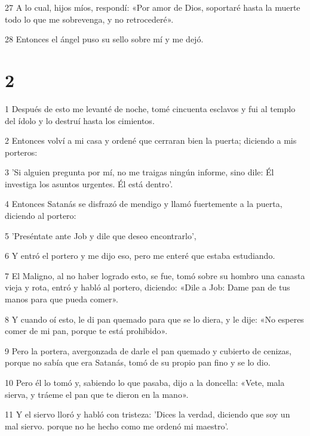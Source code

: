 \par 27 A lo cual, hijos míos, respondí: «Por amor de Dios, soportaré hasta la muerte todo lo que me sobrevenga, y no retrocederé».

\par 28 Entonces el ángel puso su sello sobre mí y me dejó.

\chapter{2}

\par 1 Después de esto me levanté de noche, tomé cincuenta esclavos y fui al templo del ídolo y lo destruí hasta los cimientos.

\par 2 Entonces volví a mi casa y ordené que cerraran bien la puerta; diciendo a mis porteros:

\par 3 'Si alguien pregunta por mí, no me traigas ningún informe, sino dile: Él investiga los asuntos urgentes. Él está dentro'.

\par 4 Entonces Satanás se disfrazó de mendigo y llamó fuertemente a la puerta, diciendo al portero:

\par 5 'Preséntate ante Job y dile que deseo encontrarlo',

\par 6 Y entró el portero y me dijo eso, pero me enteré que estaba estudiando.

\par 7 El Maligno, al no haber logrado esto, se fue, tomó sobre su hombro una canasta vieja y rota, entró y habló al portero, diciendo: «Dile a Job: Dame pan de tus manos para que pueda comer».

\par 8 Y cuando oí esto, le di pan quemado para que se lo diera, y le dije: «No esperes comer de mi pan, porque te está prohibido».

\par 9 Pero la portera, avergonzada de darle el pan quemado y cubierto de cenizas, porque no sabía que era Satanás, tomó de su propio pan fino y se lo dio.

\par 10 Pero él lo tomó y, sabiendo lo que pasaba, dijo a la doncella: «Vete, mala sierva, y tráeme el pan que te dieron en la mano».

\par 11 Y el siervo lloró y habló con tristeza: 'Dices la verdad, diciendo que soy un mal siervo. porque no he hecho como me ordenó mi maestro'.

